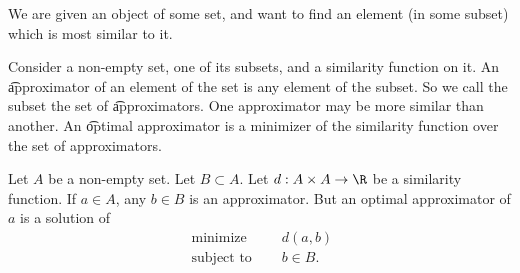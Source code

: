 
\sbasic




























\sstart
{}


We are given an object of some set, and want to find an element (in some subset) which is most similar to it.


Consider a non-empty set, one of its subsets, and a similarity function on it.
An \t{approximator} of an element of the set is any element of the subset.
So we call the subset the set of \t{approximators}.
One approximator may be more similar than another.
An \t{optimal} approximator is a minimizer of the similarity function over the set of approximators.


Let $A$ be a non-empty set.
Let $B \subset A$.
Let $d: A \times A \to \R$ be a similarity function.
If $a \in A$, any $b \in B$ is an approximator.
But an optimal approximator of $a$ is a solution of
$$
\begin{aligned}
  \text{ minimize }   & \quad d(a, b) \\
  \text{ subject to } & \quad b \in B.
\end{aligned}
$$
\strats
